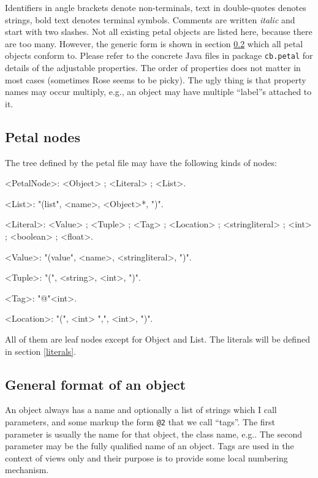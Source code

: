 \documentclass{article}
\newenvironment{mygrammar}{\begin{grammar}%
      [(colon){ $\rightarrow$}]%
      [(semicolon)$|$]%
      [(comma){ }]%
      [(period){\\}]%
      [(quote){\begin{bf}}{\end{bf}}]%
      [(nonterminal){$\langle$}{$\rangle$}]}%
      {\end{grammar}}
\begin{document}
Identifiers in angle brackets denote non-terminals, text in
double-quotes denotes strings, bold text denotes terminal symbols.
Comments are written \emph{italic} and start with two slashes. Not all
existing petal objects are listed here, because there are too many.
However, the generic form is shown in section \ref{simple} which all
petal objects conform to. Please refer to the concrete Java files in
package \texttt{cb.petal} for details of the adjustable properties.
The order of properties does not matter in most cases (sometimes Rose
seems to be picky). The ugly thing is that property names may occur
multiply, e.g., an object may have multiple ``label''s attached to it.

\subsection{Petal nodes}

The tree defined by the petal file may have the following kinds of
nodes:

\begin{mygrammar}
<PetalNode>: <Object> ; <Literal> ; <List>.

<List>:      "(list", <name>, <Object>*, ")".

<Literal>:
             <Value> ; <Tuple> ; <Tag> ; <Location> ;
             <stringliteral> ; <int> ; <boolean> ; <float>.

<Value>:     "(value", <name>, <stringliteral>, ")".

<Tuple>:     "(", <string>, <int>, ")".

<Tag>:       "@"<int>.

<Location>:  "(", <int> ",", <int>, ")".
\end{mygrammar}

All of them are leaf nodes except for Object and List. The literals
will be defined in section \ref{literals}.

\subsection{General format of an object}\label{simple}

An object always has a name and optionally a list of strings which I
call parameters, and some markup the form \texttt{@2} that we call
``tags''. The first parameter is usually the name for that object, the
class name, e.g.. The second parameter may be the fully qualified name
of an object. Tags are used in the context of views only and their
purpose is to provide some local numbering mechanism.
\end{document}
